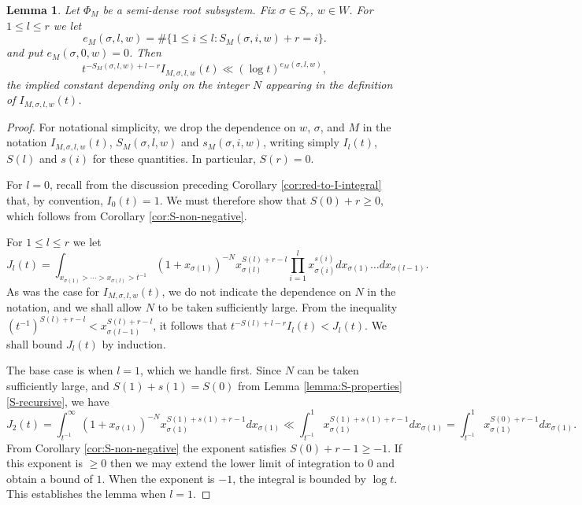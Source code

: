 \documentclass[12pt]{amsart}
\newtheorem{lemma}[theorem]{Lemma}
\theoremstyle{remark}
\begin{document}
\begin{lemma} \label{lemma_power_k}
Let $\Phi_M$ be a semi-dense root subsystem. Fix $\sigma\in S_r$, $w\in W$. For $1\le l\le r$ we let
\[
e_M(\sigma,l,w)=\#\{1\le i\le l: S_M(\sigma,i,w)+r= i\}.
\]
and put $e_M(\sigma,0,w)=0$. Then
\[
t^{ -S_M(\sigma,l,w) +l - r}I_{M,\sigma, l,w}(t)\ll (\log t)^{e_M(\sigma,l,w)},
\]
the implied constant depending only on the integer $N$ appearing in the definition of $I_{M,\sigma, l,w}(t)$. \end{lemma}

\begin{proof}
For notational simplicity, we drop the dependence on $w$, $\sigma$, and $M$ in the notation $I_{M,\sigma, l,w}(t)$, $S_M(\sigma,l,w)$ and $s_M(\sigma,i,w)$, writing simply $I_l(t)$, $S(l)$ and $s(i)$ for these quantities. In particular, $S(r)=0$.

For $l=0$, recall from the discussion preceding Corollary \ref{cor:red-to-I-integral} that, by convention, $I_0(t)=1$. We must therefore show that $S(0)+r\ge 0$, which follows from Corollary \ref{cor:S-non-negative}.

For $1\le l\le r$ we let
\[
J_l(t)=\int_{ x_{\sigma(1)} > \cdots > x_{\sigma(l)} > t^{-1} } (1 + x_{\sigma(1)})^{-N} x_{\sigma(l)}^{ S(l) + r-l} \prod_{i = 1}^{l} x_{\sigma(i)}^{s(i) } dx_{\sigma(1)} \ldots dx_{\sigma(l-1)}.
\]
As was the case for $I_{M,\sigma, l,w}(t)$, we do not indicate the dependence on $N$ in the notation, and we shall allow $N$ to be taken sufficiently large. From the inequality $(t^{-1})^{ S(l) + r-l } < x_{\sigma(l-1)}^{ S(l) + r-l }$, it follows that $t^{ -S(l) +l - r }I_l(t)<J_l(t)$. We shall bound $J_l(t)$ by induction.

The base case is when $l=1$, which we handle first. Since $N$ can be taken sufficiently large, and $S(1)+s(1)=S(0)$ from Lemma \ref{lemma:S-properties}\eqref{S-recursive}, we have
\[
J_2(t)=\int_{t^{-1}}^\infty (1 + x_{\sigma(1)})^{-N} x_{\sigma(1)}^{ S(1) +s(1)+ r - 1}  dx_{\sigma(1)}\ll \int_{t^{-1} }^1 x_{\sigma(1)}^{ S(1) +s(1)+ r - 1}  dx_{\sigma(1)}=\int_{t^{-1} }^1 x_{\sigma(1)}^{ S(0)+ r - 1}  dx_{\sigma(1)}.
\]
From Corollary \ref{cor:S-non-negative} the exponent satisfies $S(0) + r -1 \ge -1$. If this exponent is $\ge 0$ then we may extend the lower limit of integration to $0$ and obtain a bound of $1$. When the exponent is $-1$, the integral is bounded by $\log t$. This establishes the lemma when $l=1$. 


\end{proof}
\end{document}
